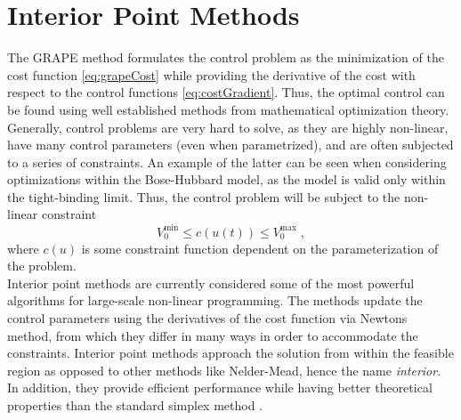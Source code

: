 \section{Interior Point Methods} \label{sec:IntPoint}

The GRAPE method formulates the control problem as the minimization of the cost function \eqref{eq:grapeCost} while providing the derivative of the cost with respect to the control functions \eqref{eq:costGradient}. Thus, the optimal control can be found using well established methods from mathematical optimization theory. Generally, control problems are very hard to solve, as they are highly non-linear, have many control parameters (even when parametrized), and are often subjected to a series of constraints. An example of the latter can be seen when considering optimizations within the Bose-Hubbard model, as the model is valid only within the tight-binding limit. Thus, the control problem will be subject to the non-linear constraint
\begin{equation}
	 V_{0}^{\mathrm{min}} \leq c (u(t)) \leq V_{0}^{\mathrm{max}} \; ,
\end{equation}
where $c (u)$ is some constraint function dependent on the parameterization of the problem.\\
Interior point methods are currently considered some of the most powerful algorithms for large-scale non-linear programming. The methods update the control parameters using the derivatives of the cost function via Newtons method, from which they differ in many ways in order to accommodate the constraints. Interior point methods approach the solution from within the feasible region as opposed to other methods like Nelder-Mead, hence the name \textit{interior}. In addition, they provide efficient performance while having better theoretical properties than the standard simplex method \cite{wright}.\\

